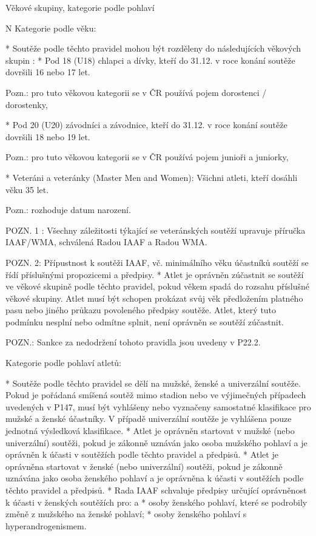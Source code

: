 \secc Věkové skupiny, kategorie podle pohlaví

\begitems \style N
Kategorie podle věku:

* Soutěže podle těchto pravidel mohou být rozděleny do následujících věkových skupin :
  \begitems
  * Pod 18 (U18) chlapci a dívky, kteří do 31.12. v roce konání soutěže dovršili 16 nebo 17 let.

  Pozn.: pro tuto věkovou kategorii se v ČR používá pojem dorostenci / dorostenky,

  * Pod 20 (U20) závodníci a závodnice, kteří do 31.12. v roce konání soutěže dovršili 18 nebo 19 let.


  Pozn.: pro tuto věkovou kategorii se v ČR používá pojem junioři a juniorky,

  * Veteráni a veteránky (Master Men and Women): Všichni atleti, kteří dosáhli věku 35 let.

  Pozn.: rozhoduje datum narození.

  POZN. 1 : Všechny záležitosti týkající se veteránských soutěží upravuje příručka IAAF/WMA, schválená Radou IAAF a Radou WMA.

  POZN. 2: Přípustnost k soutěži IAAF, vč. minimálního věku účastníků soutěží se řídí příslušnými propozicemi a předpisy.
  \enditems
* Atlet je oprávněn zúčastnit se soutěží ve věkové skupině podle těchto pravidel, pokud věkem spadá do rozsahu příslušné věkové skupiny. Atlet musí být schopen prokázat svůj věk předložením platného pasu nebo jiného průkazu povoleného předpisy soutěže. Atlet, který tuto podmínku nesplní nebo odmítne splnit, není oprávněn se soutěží zúčastnit.

POZN.: Sankce za nedodržení tohoto pravidla jsou uvedeny v P22.2.

Kategorie podle pohlaví atletů:

* Soutěže podle těchto pravidel se dělí na mužské, ženské a univerzální soutěže. Pokud je pořádaná smíšená soutěž mimo stadion nebo ve výjimečných případech uvedených v  P147, musí být vyhlášeny nebo vyznačeny samostatné klasifikace pro mužské a ženské účastníky. V případě univerzální soutěže je vyhlášena pouze jednotná výsledková klasifikace.
* Atlet je oprávněn startovat v mužské (nebo univerzální) soutěži, pokud je zákonně uznáván jako osoba mužského pohlaví a je oprávněn k účasti v soutěžích podle těchto pravidel a předpisů.
* Atlet je oprávněna startovat v ženské (nebo univerzální) soutěži, pokud je zákonně uznávána jako osoba ženského pohlaví a je oprávněna k účasti v soutěžích podle těchto pravidel a předpisů.
* Rada IAAF schvaluje předpisy určující oprávněnost k účasti v ženských soutěžích pro:
  \begitems \style a
  * osoby ženského pohlaví, které se podrobily změně z mužského na ženské pohlaví;
  * osoby ženského pohlaví s hyperandrogenismem.
  \enditems

